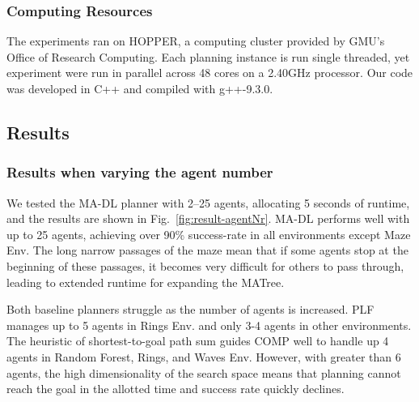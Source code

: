\documentclass[letterpaper, 10 pt, conference]{ieeeconf}  %
\begin{document}
\subsubsection{Computing Resources} 
The experiments ran on HOPPER, a computing cluster provided by GMU's Office of Research Computing. Each planning instance 
is run single threaded, yet experiment were run in parallel across 48 cores on a 2.40GHz processor. Our code was developed 
in C++ and compiled with g++-9.3.0.



\subsection{Results}

\subsubsection{Results when varying the agent number} 
We tested the MA-DL planner with 2--25 agents, allocating 5 seconds of runtime, and the results are shown in Fig.~\ref{fig:result-agentNr}. MA-DL performs well with up to 25 agents, achieving over 90\% success-rate in all environments except Maze Env. The long narrow passages of the maze mean that if some agents stop at the beginning of these passages, it becomes very difficult for others to pass through, leading to extended runtime for expanding the MATree.

Both baseline planners struggle as the number of agents is increased. PLF manages up to 5 agents in Rings Env. and only 3-4 agents in other environments. %
The heuristic of shortest-to-goal path sum guides COMP well to handle up 4 agents in Random Forest, Rings, and Waves Env. However, with greater than 6 agents, the high dimensionality of the search space means that planning cannot reach the goal in the allotted time and success rate quickly declines.
\end{document}
